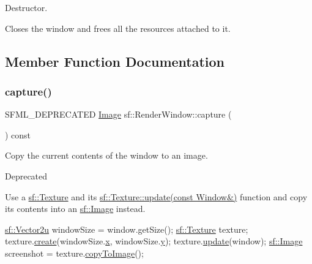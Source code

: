 Destructor. 

Closes the window and frees all the resources attached to it. 

\subsection{Member Function Documentation}
\mbox{\label{classsf_1_1_render_window_a370137abe81f6b7d62b600ceeccd54d3}} 
\subsubsection{\texorpdfstring{capture()}{capture()}}
{\footnotesize\ttfamily S\+F\+M\+L\+\_\+\+D\+E\+P\+R\+E\+C\+A\+T\+ED \hyperlink{classsf_1_1_image}{Image} sf\+::\+Render\+Window\+::capture (\begin{DoxyParamCaption}{ }\end{DoxyParamCaption}) const}



Copy the current contents of the window to an image. 

\begin{DoxyRefDesc}{Deprecated}
\item[\hyperlink{deprecated__deprecated000004}{Deprecated}]Use a \hyperlink{classsf_1_1_texture}{sf\+::\+Texture} and its \hyperlink{classsf_1_1_texture_ad3cceef238f7d5d2108a98dd38c17fc5}{sf\+::\+Texture\+::update(const Window\&)} function and copy its contents into an \hyperlink{classsf_1_1_image}{sf\+::\+Image} instead. \end{DoxyRefDesc}

\begin{DoxyCode}
\hyperlink{classsf_1_1_vector2}{sf::Vector2u} windowSize = window.getSize();
\hyperlink{classsf_1_1_texture}{sf::Texture} texture;
texture.\hyperlink{classsf_1_1_texture_a89b4c7d204acf1033c3a1b6e0a3ad0a3}{create}(windowSize.\hyperlink{classsf_1_1_vector2_a1e6ad77fa155f3753bfb92699bd28141}{x}, windowSize.\hyperlink{classsf_1_1_vector2_a420f2481b015f4eb929c75f2af564299}{y});
texture.\hyperlink{classsf_1_1_texture_ae4eab5c6781316840b0c50ad08370963}{update}(window);
\hyperlink{classsf_1_1_image}{sf::Image} screenshot = texture.\hyperlink{classsf_1_1_texture_a77e18a70de2e525ac5e4a7cd95f614b9}{copyToImage}();
\end{DoxyCode}


